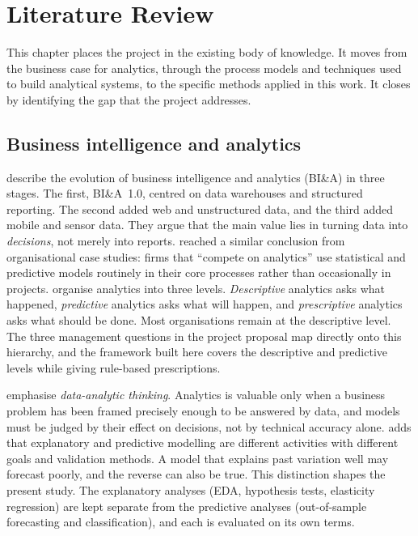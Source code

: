 \chapter{Literature Review}\label{ch:literature}

This chapter places the project in the existing body of knowledge. It moves from the business case for
analytics, through the process models and techniques used to build analytical systems, to the specific
methods applied in this work. It closes by identifying the gap that the project addresses.

\section{Business intelligence and analytics}
\citet{chen2012} describe the evolution of business intelligence and analytics (BI\&A) in three stages. The
first, BI\&A~1.0, centred on data warehouses and structured reporting. The second added web and unstructured
data, and the third added mobile and sensor data. They argue that the main value lies in turning data into
\emph{decisions}, not merely into reports. \citet{davenport2007} reached a similar conclusion from
organisational case studies: firms that ``compete on analytics'' use statistical and predictive models
routinely in their core processes rather than occasionally in projects. \citet{sharda2018} organise analytics
into three levels. \emph{Descriptive} analytics asks what happened, \emph{predictive} analytics asks what will
happen, and \emph{prescriptive} analytics asks what should be done. Most organisations remain at the descriptive
level. The three management questions in the project proposal map directly onto this hierarchy, and the
framework built here covers the descriptive and predictive levels while giving rule-based prescriptions.

\citet{provost2013} emphasise \emph{data-analytic thinking}. Analytics is valuable only when a business problem
has been framed precisely enough to be answered by data, and models must be judged by their effect on
decisions, not by technical accuracy alone. \citet{shmueli2010} adds that explanatory and predictive modelling
are different activities with different goals and validation methods. A model that explains past variation
well may forecast poorly, and the reverse can also be true. This distinction shapes the present study. The
explanatory analyses (EDA, hypothesis tests, elasticity regression) are kept separate from the predictive
analyses (out-of-sample forecasting and classification), and each is evaluated on its own terms.


